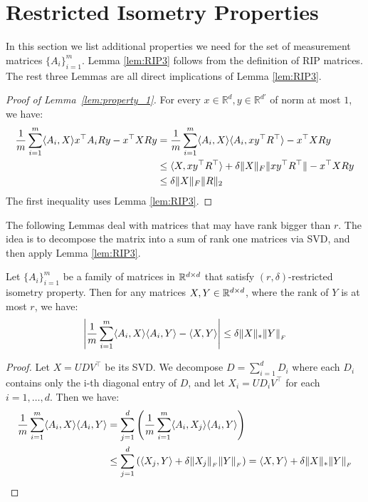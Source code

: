 \section{Restricted Isometry Properties}\label{sec:rip}

In this section we list additional properties we need for the set of measurement matrices $\{A_i\}_{i=1}^m$.
Lemma \ref{lem:RIP3} follows from the definition of RIP matrices.
The rest three Lemmas are all direct implications of Lemma \ref{lem:RIP3}.
\begin{proof}[Proof of Lemma~\ref{lem:property_1}]
For every $x \in \mathbb{R}^d, y \in \mathbb{R}^{d'}$ of norm at most $1$,
we have: 
\begin{align*}
	\frac 1 m \sum_{i = 1}^m \langle {A}_i , {X} \rangle x^{\top}{A}_i {R} y - x^{\top}{X} {R} y
	&= \frac 1 m \sum_{i = 1}^m \langle {A}_i , {X} \rangle \langle {A}_i, x y^{\top}{R}^{\top} \rangle - x^{\top}{X} {R} y \\
	& \leq \langle {X}, xy^{\top} {R}^{\top} \rangle  + \delta \| {X} \|_F \|xy^{\top}{R}^{\top}\| - x^{\top}{X} {R} y \\
	& \leq \delta \| {X} \|_F \|{R}\|_2
\end{align*}
The first inequality uses Lemma \ref{lem:RIP3}.
\end{proof}

The following Lemmas deal with matrices that may have rank bigger than $r$.
The idea is to decompose the matrix into a sum of rank one
matrices via SVD, and then apply Lemma \ref{lem:RIP3}.

\begin{lem}\label{lem:RIP4}
	Let $\{A_i\}_{i=1}^m$ be a family of matrices in $\mathbb{R}^{d \times d}$
	that satisfy $(r, \delta)$-restricted isometry property.
	Then for any matrices $X, Y \in \mathbb{R}^{d \times d}$,
	where the rank of $Y$ is at most $r$,
	we have:
	\[ \left|{\frac 1 m \sum_{i=1}^m \langle A_i, X\rangle \langle A_i, Y\rangle 		- \langle X, Y\rangle }\right|
		\le \delta \|X\|_{*} \|Y\|_{_{F}} \]
\end{lem}

\begin{proof}
	Let $X = U D V^{\top}$ be its SVD.
	We decompose $D = \sum_{i=1}^d D_i$ where each $D_i$ contains only the i-th	diagonal entry of $D$,
	and let $X_i = U D_i V^{\top}$ for each $i=1,\dots,d$.
	Then we have:
	\begin{align*}
		\frac 1 m \sum_{i=1}^m \langle A_i, X\rangle \langle A_i, Y\rangle
		&= \sum_{j=1}^d \left( \frac 1 m \sum_{i=1}^m \langle A_i, X_j\rangle \langle A_i, Y\rangle \right) \\
		&\le \sum_{j=1}^d \left(\langle X_j, Y\rangle + \delta \|X_j\|_{_{F}}\|Y\|_{_{F}} \right) = \langle X, Y\rangle + \delta \|X\|_{*} \|Y\|_{_{F}}
	\end{align*}
\end{proof}

